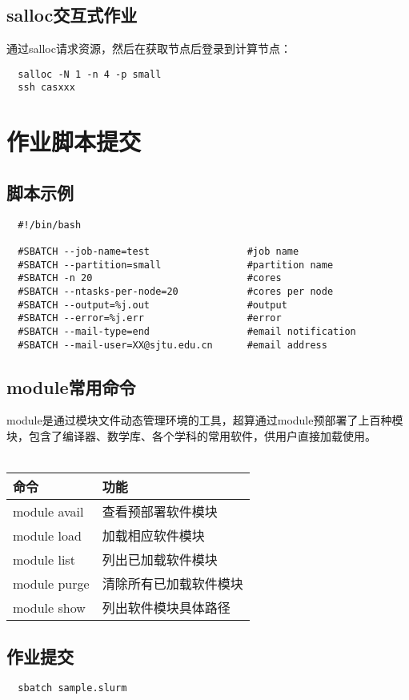 \documentclass[cn, 12pt, hang, black, chinese]{elegantbook}
\begin{document}
\subsection*{salloc交互式作业}
通过salloc请求资源，然后在获取节点后登录到计算节点：
\begin{lstlisting}
  salloc -N 1 -n 4 -p small
  ssh casxxx
\end{lstlisting}

\section{作业脚本提交}

\subsection*{脚本示例}
\begin{lstlisting}
  #!/bin/bash

  #SBATCH --job-name=test                 #job name
  #SBATCH --partition=small               #partition name
  #SBATCH -n 20                           #cores
  #SBATCH --ntasks-per-node=20            #cores per node
  #SBATCH --output=%j.out                 #output
  #SBATCH --error=%j.err                  #error
  #SBATCH --mail-type=end                 #email notification
  #SBATCH --mail-user=XX@sjtu.edu.cn      #email address
\end{lstlisting}

\subsection*{module常用命令}
module是通过模块文件动态管理环境的工具，超算通过module预部署了上百种模块，包含了编译器、数学库、各个学科的常用软件，供用户直接加载使用。\\\\
\begin{tabular}{ |l|l| }
 \hline
 命令 & 功能 \\
 \hline \hline
 module avail & 查看预部署软件模块 \\
 \hline
 module load & 加载相应软件模块 \\
 \hline
 module list & 列出已加载软件模块 \\
 \hline
 module purge & 清除所有已加载软件模块 \\
 \hline
 module show & 列出软件模块具体路径 \\
 \hline
\end{tabular}

\subsection*{作业提交}
\begin{lstlisting}
  sbatch sample.slurm
\end{lstlisting}
\end{document}
